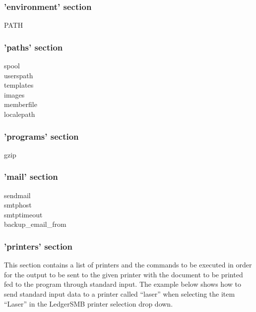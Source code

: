\subsubsection{'environment' section}

\begin{description}
\item[PATH]
\end{description}


\subsubsection{'paths' section}

\begin{description}
\item [spool]
\item [userspath]
\item [templates]
\item [images]
\item [memberfile]
\item [localepath]
\end{description}

\subsubsection{'programs' section}

\begin{description}
\item [gzip]
\end{description}


\subsubsection{'mail' section}

\begin{description}
\item [sendmail]
\item [smtphost]
\item [smtptimeout]
\item [backup\_email\_from]
\end{description}

\subsubsection{'printers' section}

This section contains a list of printers and the commands
to be executed in order for the output to be sent to the given printer with
the document to be printed fed to the program through standard input.
The example below shows how to send standard input data to a printer called ``laser''
when selecting the item ``Laser'' in the LedgerSMB printer selection drop down.

